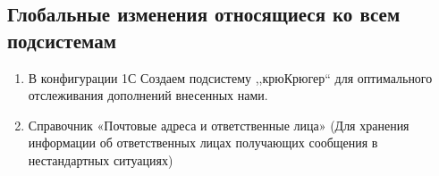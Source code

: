 
\subsection{Глобальные изменения относящиеся ко всем подсистемам}
\begin{enumerate}	
	\item В конфигурации 1С Создаем подсистему ,,крюКрюгер`` для оптимального отслеживания дополнений внесенных нами.
	\item Справочник «Почтовые адреса и ответственные лица» (Для хранения информации об ответственных лицах получающих сообщения в нестандартных ситуациях)
\end{enumerate}	
